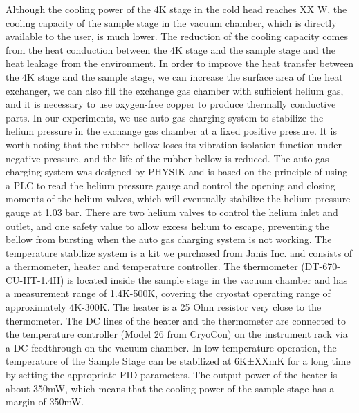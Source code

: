 Although the cooling power of the 4K stage in the cold head reaches XX W, the cooling capacity of the sample stage in the vacuum chamber, which is directly available to the user, is much lower. The reduction of the cooling capacity comes from the heat conduction between the 4K stage and the sample stage and the heat leakage from the environment. In order to improve the heat transfer between the 4K stage and the sample stage, we can increase the surface area of the heat exchanger, we can also fill the exchange gas chamber with sufficient helium gas, and it is necessary to use oxygen-free copper to produce thermally conductive parts. In our experiments, we use auto gas charging system to stabilize the helium pressure in the exchange gas chamber at a fixed positive pressure. It is worth noting that the rubber bellow loses its vibration isolation function under negative pressure, and the life of the rubber bellow is reduced. The auto gas charging system was designed by PHYSIK and is based on the principle of using a PLC to read the helium pressure gauge and control the opening and closing moments of the helium valves, which will eventually stabilize the helium pressure gauge at 1.03 bar. There are two helium valves to control the helium inlet and outlet, and one safety value to allow excess helium to escape, preventing the bellow from bursting when the auto gas charging system is not working. The temperature stabilize system is a kit we purchased from Janis Inc. and consists of a thermometer, heater and temperature controller. The thermometer (DT-670-CU-HT-1.4H) is located inside the sample stage in the vacuum chamber and has a measurement range of 1.4K-500K, covering the cryostat operating range of approximately 4K-300K. The heater is a 25 Ohm resistor very close to the thermometer. The DC lines of the heater and the thermometer are connected to the temperature controller (Model 26 from CryoCon) on the instrument rack via a DC feedthrough on the vacuum chamber. In low temperature operation, the temperature of the Sample Stage can be stabilized at 6K±XXmK for a long time by setting the appropriate PID parameters. The output power of the heater is about 350mW, which means that the cooling power of the sample stage has a margin of 350mW.
